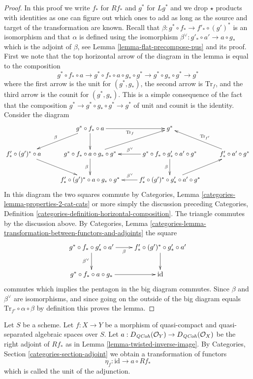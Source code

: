 \begin{proof}
In this proof we write $f_*$ for $Rf_*$ and $g^*$ for $Lg^*$ and we
drop $\star$ products with identities as one can figure out which ones
to add as long as the source and target of the transformation are known.
Recall that $\beta : g^* \circ f_* \to f'_* \circ (g')^*$ is an isomorphism
and that $\alpha$ is defined using
the isomorphism $\beta^\vee : g'_* \circ a' \to a \circ g_*$
which is the adjoint of $\beta$, see Lemma \ref{lemma-flat-precompose-pus}
and its proof. First we note that the top horizontal arrow
of the diagram in the lemma is equal to the composition
$$
g^* \circ f_* \circ a \to
g^* \circ f_* \circ a \circ g_* \circ g^* \to
g^* \circ g_* \circ g^* \to g^*
$$
where the first arrow is the unit for $(g^*, g_*)$, the second arrow
is $\text{Tr}_f$, and the third arrow is the counit for $(g^*, g_*)$.
This is a simple consequence of the fact that the composition
$g^* \to g^* \circ g_* \circ g^* \to g^*$ of unit and counit is the identity.
Consider the diagram
$$
\xymatrix{
& g^* \circ f_* \circ a \ar[ld]_\beta \ar[d] \ar[r]_{\text{Tr}_f} & g^* \\
f'_* \circ (g')^* \circ a \ar[dr] &
g^* \circ f_* \circ a \circ g_* \circ g^* \ar[d]_\beta \ar[ru] &
g^* \circ f_* \circ g'_* \circ a' \circ g^* \ar[l]_{\beta^\vee} \ar[d]_\beta &
f'_* \circ a' \circ g^* \ar[lu]_{\text{Tr}_{f'}} \\
& f'_* \circ (g')^* \circ a \circ g_* \circ g^* &
f'_* \circ (g')^* \circ g'_* \circ a' \circ g^* \ar[ru] \ar[l]_{\beta^\vee}
}
$$
In this diagram the two squares commute by 
Categories, Lemma \ref{categories-lemma-properties-2-cat-cats}
or more simply the discussion preceding
Categories, Definition \ref{categories-definition-horizontal-composition}.
The triangle commutes by the discussion above. By
Categories, Lemma
\ref{categories-lemma-transformation-between-functors-and-adjoints}
the square
$$
\xymatrix{
g^* \circ f_* \circ g'_* \circ a' \ar[d]_{\beta^\vee} \ar[r]_-\beta &
f'_* \circ (g')^* \circ g'_* \circ a' \ar[d] \\
g^* \circ f_* \circ a \circ g_* \ar[r] &
\text{id}
}
$$
commutes which implies the pentagon in the big diagram commutes.
Since $\beta$ and $\beta^\vee$ are isomorphisms, and since going on
the outside of the big diagram equals
$\text{Tr}_{f'} \circ \alpha \circ \beta$ by definition this proves the lemma.
\end{proof}

\noindent
Let $S$ be a scheme.
Let $f : X \to Y$ be a morphism of quasi-compact and quasi-separated
algebraic spaces over $S$.
Let $a : D_{\mathit{QCoh}}(\mathcal{O}_Y) \to D_{\mathit{QCoh}}(\mathcal{O}_X)$
be the right adjoint of $Rf_*$ as in
Lemma \ref{lemma-twisted-inverse-image}. By
Categories, Section \ref{categories-section-adjoint} we obtain a
transformation of functors
$$
\eta_f : \text{id} \to  a \circ Rf_*
$$
which is called the unit of the adjunction.

